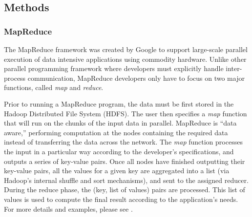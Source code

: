 %
\subsection{Methods}


\subsubsection{MapReduce}
The MapReduce framework was created by Google to support large-scale parallel execution of data intensive applications using commodity hardware\cite{dean2008mapreduce}.
Unlike other parallel programming framework where developers must explicitly handle inter-process communication, MapReduce developers only have to focus on two major functions, called \emph{map} and \emph{reduce}.

Prior to running a MapReduce program, the data must be first stored in the Hadoop Distributed File System (HDFS).
The user then specifies a \emph{map} function that will run on the chunks of the input data in parallel.
MapReduce is ``data aware,'' performing computation at the nodes containing the required data instead of transferring the data across the network.
The \emph{map} function processes the input in a particular way according to the developer’s specifications, and outputs a series of key-value pairs. Once all nodes have finished outputting their key-value pairs, all the values for a given key are aggregated into a list (via Hadoop's internal shuffle and sort mechanisms), and sent to the assigned reducer. During the reduce phase, the (key, list of values) pairs are processed. This list of values is used to compute the final result according to the application’s needs.
For more details and examples, please see \cite{dean2008mapreduce}.


